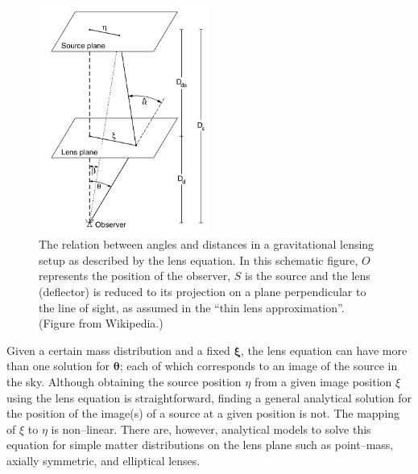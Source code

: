 \documentclass[paper=a4, fontsize=11pt]{scrartcl} %
\numberwithin{equation}{section} %
\numberwithin{figure}{section} %
\numberwithin{table}{section} %
\begin{document}
\begin{figure}[][t]
 \label{fig:config}
 \centering
\includegraphics[width=0.5\textwidth]{figs/Gravitational-lensing-angles}
 \caption{The relation between angles and distances in a gravitational lensing setup as described by the lens equation. In this schematic figure, $O$ represents the position of the observer, $S$ is the source and the lens (deflector) is reduced to its projection on a plane perpendicular to the line of sight, as assumed in the ``thin lens approximation''. (Figure from Wikipedia.)}
 \end{figure}

Given a certain mass distribution and a fixed $\boldsymbol \xi$, the lens equation can have more than one solution for $\boldsymbol \theta$; each of which corresponds to an image of the source in the sky.  Although obtaining the source position $\eta$ from a given image position $\xi$ using the lens equation is straightforward, finding a general analytical solution for the position of the image(s) of a source at a given position is not. The mapping of $\xi$ to $\eta$ is non--linear. There are, however, analytical models to solve this equation for simple matter distributions on the lens plane such as point--mass, axially symmetric, and elliptical lenses.
\end{document}
